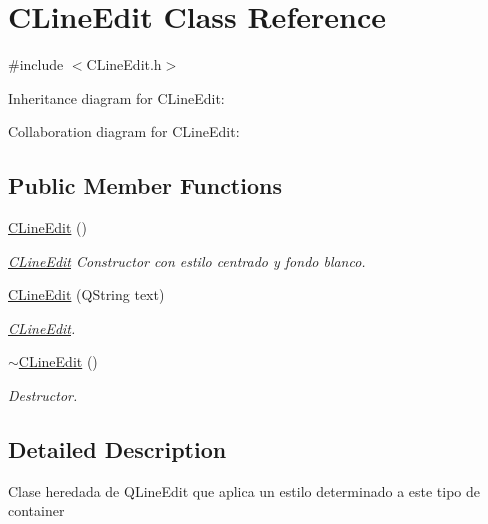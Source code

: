 \hypertarget{classCLineEdit}{}\section{C\+Line\+Edit Class Reference}
\label{classCLineEdit}


{\ttfamily \#include $<$C\+Line\+Edit.\+h$>$}



Inheritance diagram for C\+Line\+Edit\+:


Collaboration diagram for C\+Line\+Edit\+:
\subsection*{Public Member Functions}
\begin{DoxyCompactItemize}
\item 
\hyperlink{classCLineEdit_afb3493949a61a9d51eea5182bfc0a591}{C\+Line\+Edit} ()\hypertarget{classCLineEdit_afb3493949a61a9d51eea5182bfc0a591}{}\label{classCLineEdit_afb3493949a61a9d51eea5182bfc0a591}

\begin{DoxyCompactList}\small\item\em \hyperlink{classCLineEdit}{C\+Line\+Edit} Constructor con estilo centrado y fondo blanco. \end{DoxyCompactList}\item 
\hyperlink{classCLineEdit_a67d172f77a4cd9233aee3684248436f5}{C\+Line\+Edit} (Q\+String text)
\begin{DoxyCompactList}\small\item\em \hyperlink{classCLineEdit}{C\+Line\+Edit}. \end{DoxyCompactList}\item 
\hyperlink{classCLineEdit_a4d03efd8b636f5f9a584200e222ca6cc}{$\sim$\+C\+Line\+Edit} ()\hypertarget{classCLineEdit_a4d03efd8b636f5f9a584200e222ca6cc}{}\label{classCLineEdit_a4d03efd8b636f5f9a584200e222ca6cc}

\begin{DoxyCompactList}\small\item\em Destructor. \end{DoxyCompactList}\end{DoxyCompactItemize}


\subsection{Detailed Description}
Clase heredada de \textquotesingle{}Q\+Line\+Edit\textquotesingle{} que aplica un estilo determinado a este tipo de container 

